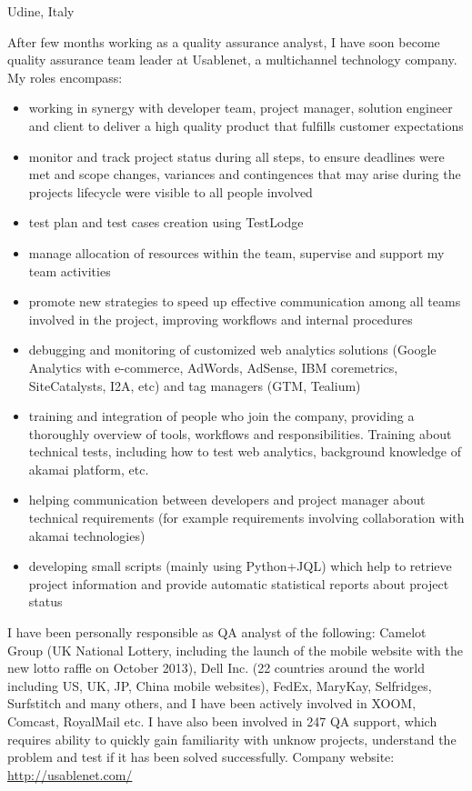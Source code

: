 \documentclass[10pt,a4paper]{moderncv}   %
\begin{document}
   {Udine, Italy}{}{After few months working as a quality assurance analyst, I
      have soon become
   quality assurance team leader at Usablenet, a multichannel technology
   company. 
   My roles encompass:
   \begin{itemize}
\item 
  working in synergy with 
   developer team,  project manager, solution engineer and client to deliver a high quality
   product that fulfills customer expectations 
\item monitor and track project status during all steps, to ensure deadlines
   were met and scope changes,
 variances and contingences that may arise during the 
 projects lifecycle were visible to all people involved
\item test plan and test cases creation using TestLodge
 \item manage  allocation of resources within the team, supervise and support my team
    activities
\item promote new strategies to speed up effective communication among all
   teams involved in the project,
   improving workflows and internal procedures
\item debugging and monitoring of customized web analytics solutions  (Google
   Analytics with e-commerce, AdWords, AdSense, IBM coremetrics,
   SiteCatalysts, I2A, etc) and tag managers (GTM,
   Tealium) 
\item training and integration of people who join the company, providing a
   thoroughly overview of tools, workflows and responsibilities.
   Training about
   technical tests, including how
   to test web
   analytics, background knowledge of akamai platform, etc.
\item helping communication between developers and project manager
   about technical requirements (for example requirements involving
   collaboration with akamai technologies)
\item developing small scripts (mainly using Python+JQL) which help to retrieve project
 information and provide automatic statistical reports about project status
 \end{itemize} 
   I have been personally responsible as QA analyst of the following:
   Camelot Group (UK National Lottery, including the
   launch of the mobile website with the new lotto raffle on October 2013), Dell Inc. (22 countries
   around the world including US, UK, JP, China mobile websites), FedEx,
   MaryKay, Selfridges, Surfstitch and many others, and I have been actively involved in
   XOOM, Comcast, RoyalMail etc.
I have also been involved in 247 QA support, which requires ability to quickly gain
familiarity with unknow projects, understand the problem and test if it has
been solved successfully.
Company website: \url{http://usablenet.com/}}
\end{document}
